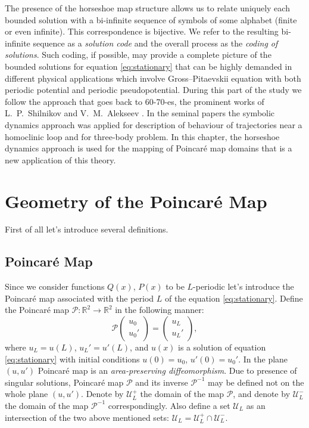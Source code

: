 The presence of the horseshoe map structure allows us to relate uniquely each bounded solution with a bi-infinite sequence of symbols of some alphabet (finite or even infinite).
This correspondence is bijective.
We refer to the resulting bi-infinite sequence as a {\it solution code} and the overall process as the {\it coding of solutions}.
Such coding, if possible, may provide a complete picture of the bounded solutions for equation \eqref{eq:stationary} that can be highly demanded in different physical applications which involve Gross--Pitaevskii equation with both periodic potential and periodic pseudopotential.
During this part of the study we follow the approach that goes back to 60-70-es, the prominent works of L.~P.~Shilnikov \cite{Shilnikov} and V.~M.~Alekseev \cite{Alekseev}.
In the seminal papers the symbolic dynamics approach was applied for description of behaviour of trajectories near a homoclinic loop and for three-body problem.
In this chapter, the horseshoe dynamics approach is used for the mapping of Poincar\'e map domains that is a new application of this theory.

\section{Geometry of the Poincar\'e Map}

First of all let's introduce several definitions.

\subsection{Poincar\'e Map}

Since we consider functions $Q(x)$, $P(x)$ to be $L$-periodic let's introduce the Poincar\'e map associated with the period $L$ of the equation \eqref{eq:stationary}.
Define the Poincar\'e map $\mathcal{P}: \mathbb{R}^2 \to \mathbb{R}^2$ in the following manner:
\begin{equation}
	\mathcal{P} \begin{pmatrix} u_0 \\ u_0' \end{pmatrix}
	= \begin{pmatrix} u_L \\ u_L' \end{pmatrix},
\label{eq:poincare-map}
\end{equation}
where $u_L = u(L)$, $u_L' = u'(L)$, and $u(x)$ is a solution of equation \eqref{eq:stationary} with initial conditions $u(0) = u_0$, $u'(0) = u_0'$.
In the plane $(u, u')$ Poincar\'e map is an {\it area-preserving diffeomorphism}.
Due to presence of singular solutions, Poincar\'e map $\mathcal{P}$ and its inverse $\mathcal{P}^{-1}$ may be defined not on the whole plane $(u, u')$.
Denote by $\mathscr{U}_L^+$ the domain of the map $\mathcal{P}$, and denote by $\mathscr{U}_L^-$ the domain of the map $\mathcal{P}^{-1}$ correspondingly.
Also define a set $\mathscr{U}_L$ as an intersection of the two above mentioned sets: $\mathscr{U}_L = \mathscr{U}_L^+ \cap \mathscr{U}_L^-$.

